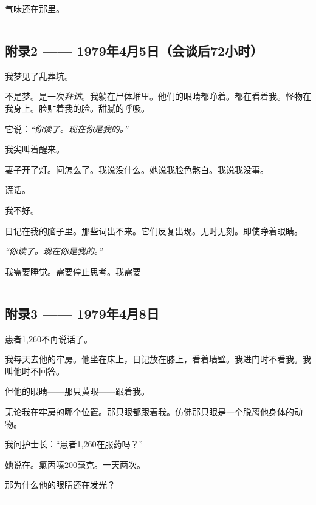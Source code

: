 \noindent 气味还在那里。

\vspace{0.5em}\noindent\rule{\textwidth}{0.5pt}\vspace{0.5em}

\subsection*{附录2 —— 1979年4月5日（会谈后72小时）}

\noindent 我梦见了乱葬坑。

\noindent 不是梦。是一次\textit{拜访}。我躺在尸体堆里。他们的眼睛都睁着。都在看着我。怪物在我身上。脸贴着我的脸。甜腻的呼吸。

\noindent 它说：\textit{“你读了。现在你是我的。”}

\noindent 我尖叫着醒来。

\noindent 妻子开了灯。问怎么了。我说没什么。她说我脸色煞白。我说我没事。

\noindent 谎话。

\noindent 我不好。

\noindent 日记在我的脑子里。那些词出不来。它们反复出现。无时无刻。即使睁着眼睛。

\noindent \textit{“你读了。现在你是我的。”}

\noindent 我需要睡觉。需要停止思考。我需要——

\vspace{0.5em}\noindent\rule{\textwidth}{0.5pt}\vspace{0.5em}

\subsection*{附录3 —— 1979年4月8日}

\noindent 患者1,260不再说话了。

\noindent 我每天去他的牢房。他坐在床上，日记放在膝上，看着墙壁。我进门时不看我。我叫他时不回答。

\noindent 但他的眼睛——那只黄眼——跟着我。

\noindent 无论我在牢房的哪个位置。那只眼都跟着我。仿佛那只眼是一个脱离他身体的动物。

\noindent 我问护士长：“患者1,260在服药吗？”

\noindent 她说在。氯丙嗪200毫克。一天两次。

\noindent 那为什么他的眼睛还在发光？

\vspace{0.5em}\noindent\rule{\textwidth}{0.5pt}\vspace{0.5em}

